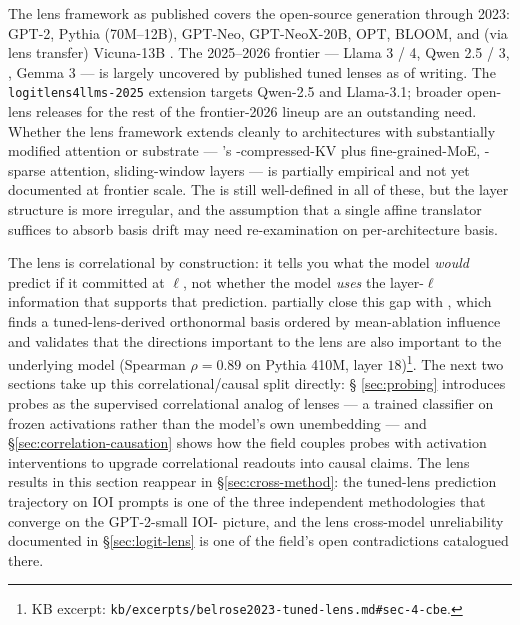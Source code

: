 The lens framework as published covers the open-source generation
through 2023: GPT-2, Pythia (70M–12B), GPT-Neo, GPT-NeoX-20B, OPT,
BLOOM, and (via lens transfer) Vicuna-13B
\citep[\S 3, \S 5]{belrose2023-tuned-lens}. The 2025–2026 frontier ---
Llama 3 / 4, Qwen 2.5 / 3, , Gemma 3 --- is largely
uncovered by published tuned lenses as of writing. The
\texttt{logitlens4llms-2025} extension targets Qwen-2.5 and Llama-3.1;
broader open-lens releases for the rest of the frontier-2026 lineup
are an outstanding need. Whether the lens framework extends cleanly
to architectures with substantially modified attention or  substrate
--- 's -compressed-KV plus fine-grained-MoE, -sparse
attention, sliding-window layers --- is partially empirical and not
yet documented at frontier scale. The  is still
well-defined in all of these, but the layer structure is more
irregular, and the assumption that a single affine translator suffices
to absorb basis drift may need re-examination on per-architecture
basis.

The lens is correlational by construction: it tells you what the model
\emph{would} predict if it committed at $\ell$, not whether the model
\emph{uses} the layer-$\ell$ information that supports that prediction.
\citet[\S 4]{belrose2023-tuned-lens} partially close this gap with
\emph{}, which finds a tuned-lens-derived
orthonormal basis ordered by mean-ablation influence and validates that
the directions important to the lens are also important to the
underlying model (Spearman $\rho = 0.89$ on Pythia 410M, layer
$18$)\footnote{KB excerpt:
\texttt{kb/excerpts/belrose2023-tuned-lens.md\#sec-4-cbe}.}. The next
two sections take up this correlational/causal split directly: §%
\ref{sec:probing} introduces probes as the supervised correlational
analog of lenses --- a trained classifier on frozen activations rather
than the model's own unembedding --- and §\ref{sec:correlation-causation}
shows how the field couples probes with activation interventions to
upgrade correlational readouts into causal claims. The lens results in
this section reappear in §\ref{sec:cross-method}: the tuned-lens
prediction trajectory on IOI prompts is one of the three independent
methodologies that converge on the GPT-2-small IOI- picture, and
the lens cross-model unreliability documented in
\S\ref{sec:logit-lens} is one of the field's open contradictions
catalogued there.

